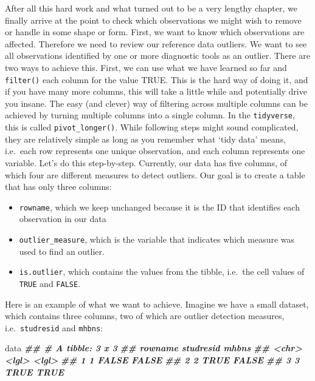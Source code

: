 \documentclass[
]{book}
\newenvironment{Shaded}{\begin{snugshade}}{\end{snugshade}}
\newcommand{\DocumentationTok}[1]{\textcolor[rgb]{0.56,0.35,0.01}{\textbf{\textit{#1}}}}
\newcommand{\NormalTok}[1]{#1}
\begin{document}
After all this hard work and what turned out to be a very lengthy chapter, we finally arrive at the point to check which observations we might wish to remove or handle in some shape or form. First, we want to know which observations are affected. Therefore we need to review our reference data outliers. We want to see all observations identified by one or more diagnostic tools as an outlier. There are two ways to achieve this. First, we can use what we have learned so far and \texttt{filter()} each column for the value TRUE. This is the hard way of doing it, and if you have many more columns, this will take a little while and potentially drive you insane. The easy (and clever) way of filtering across multiple columns can be achieved by turning multiple columns into a single column. In the \texttt{tidyverse}, this is called \texttt{pivot\_longer()}. While following steps might sound complicated, they are relatively simple as long as you remember what `tidy data' means, i.e.~each row represents one unique observation, and each column represents one variable. Let's do this step-by-step. Currently, our data has five columns, of which four are different measures to detect outliers. Our goal is to create a table that has only three columns:

\begin{itemize}
\item
  \texttt{rowname}, which we keep unchanged because it is the ID that identifies each observation in our data
\item
  \texttt{outlier\_measure}, which is the variable that indicates which measure was used to find an outlier.
\item
  \texttt{is.outlier}, which contains the values from the tibble, i.e.~the cell values of \texttt{TRUE} and \texttt{FALSE}.
\end{itemize}

Here is an example of what we want to achieve. Imagine we have a small dataset, which contains three columns, two of which are outlier detection measures, i.e.~\texttt{studresid} and \texttt{mhbns}:

\begin{Shaded}
\begin{Highlighting}[]
\NormalTok{data}
\DocumentationTok{\#\# \# A tibble: 3 x 3}
\DocumentationTok{\#\#   rowname studresid mhbns}
\DocumentationTok{\#\#   \textless{}chr\textgreater{}   \textless{}lgl\textgreater{}     \textless{}lgl\textgreater{}}
\DocumentationTok{\#\# 1 1       FALSE     FALSE}
\DocumentationTok{\#\# 2 2       TRUE      FALSE}
\DocumentationTok{\#\# 3 3       TRUE      TRUE}
\end{Highlighting}
\end{Shaded}
\end{document}
